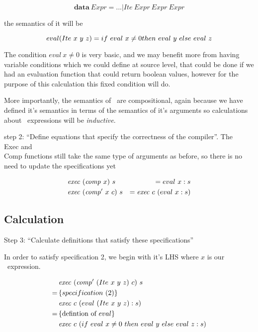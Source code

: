 \documentclass {article}
\begin{document}
	\[ \textbf{data}\ Expr = ... | Ite\ Expr\ Expr\ Expr \]

the semantics of it will be

\begin{equation}
eval(Ite\ x\ y\ z) \\
	= if\ eval\ x \not= 0 then\ eval\ y\ else\ eval\ z 
			\label{evalite}
\end{equation}

The condition $eval\ x  \not= 0$ is very basic,
and we may benefit more from having variable conditions
which we could define at source level,
that could be done if we had an evaluation function 
that could return boolean values, 
however for the purpose of this calculation
this fixed condition will do.

More importantly, the semantics of \ite\
are compositional, 
again because we have defined it's
semantics in terms of the semantics of 
it's arguments so
calculations about \ite\ expressions
will be \emph{inductive}.

step 2: ``Define equations that specify the correctness of the compiler''.
The \\Exec and \\Comp functions still take the same
type of arguments as before,
so there is no need to update the specifications yet

\begin{eqnarray*}
	 &\mathit{exec\ }  (\mathit{comp\ }  x)\  s &= eval\  x:s \\
	 &\mathit{exec\ }  (\mathit{comp'\ }   x\  c)\ s &= \mathit{exec\ }  c\  (eval\ x:s) 
\end{eqnarray*}

\subsection{Calculation}

Step 3: ``Calculate definitions that 
		satisfy these specifications''

In order to satisfy specification 2,
we begin with it's LHS where $x$ is our
\ite\ expression.

\begin{align*}
	&\mathit{exec\ } (\mathit{comp'\ }  (Ite\ x\ y\ z)\ c)\ s \\
	=\, & \{specification\ (2) \} \\
	&\mathit{exec\ } c\ (eval\ (Ite\ x\ y\ z) : s) \\
	=\, & \{\mbox{defintion of}\ eval\} \\
	&\mathit{exec\ } c\ (if\ eval\ x \not= 0\ then\ eval\ y\ else\ eval\ z :s)
\end{align*}
\end{document}
